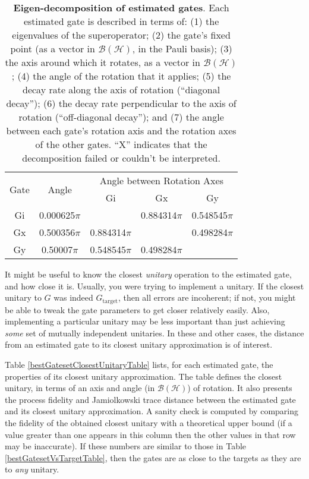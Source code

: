 \documentclass{article}[11pt]
\begin{document}
\begin{table}[h]
\begin{center}
\vspace{2em}
\begin{tabular}[l]{|c|c|c|c|c|}
\hline
\multirow{2}{*}{Gate} & \multirow{2}{*}{Angle} & \multicolumn{3}{c|}{Angle between Rotation Axes} \\ \cline{3-5}
 & & Gi & Gx & Gy \\ \hline
Gi & 0.000625$\pi$ &  & 0.884314$\pi$ & 0.548545$\pi$ \\ \hline
Gx & 0.500356$\pi$ & 0.884314$\pi$ &  & 0.498284$\pi$ \\ \hline
Gy & 0.50007$\pi$ & 0.548545$\pi$ & 0.498284$\pi$ &  \\ \hline
\end{tabular}

\caption{\textbf{Eigen-decomposition of estimated gates}.  Each estimated gate is described in terms of: (1) the eigenvalues of the superoperator; (2) the gate's fixed point (as a vector in $\mathcal{B}(\mathcal{H})$, in the Pauli basis); (3)  the axis around which it rotates, as a vector in $\mathcal{B}(\mathcal{H})$; (4) the angle of the rotation that it applies; (5) the decay rate along the axis of rotation (``diagonal decay''); (6) the decay rate perpendicular to the axis of rotation (``off-diagonal decay''); and (7) the angle between each gate's rotation axis and the rotation axes of the other gates.  ``X'' indicates that the decomposition failed or couldn't be interpreted. \label{bestGatesetDecompTable}}
\end{center}
\end{table}

It might be useful to know the closest \emph{unitary} operation to the estimated gate, and how close it is.  Usually, you were trying to implement a unitary.  If the closest unitary to $G$ was indeed $G_{\mathrm{target}}$, then all errors are incoherent; if not, you might be able to tweak the gate parameters to get closer relatively easily.  Also, implementing a particular unitary may be less important than just achieving \emph{some} set of mutually independent unitaries.  In these and other cases, the distance from an estimated gate to its closest unitary approximation is of interest.

Table \ref{bestGatesetClosestUnitaryTable} lists, for each estimated gate, the properties of its closest unitary approximation.  The table defines the closest unitary, in terms of an axis and angle (in $\mathcal{B}(\mathcal{H})$) of rotation.  It also presents the process fidelity and Jamiolkowski trace distance between the estimated gate and its closest unitary approximation.  A sanity check is computed by comparing the fidelity of the obtained closest unitary with a theoretical upper bound (if a value greater than one appears in this column then the other values in that row may be inaccurate).  If these numbers are similar to those in Table \ref{bestGatesetVsTargetTable}, then the gates are as close to the targets as they are to \emph{any} unitary.
\end{document}
